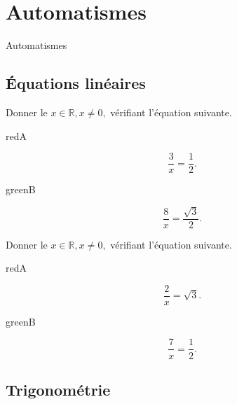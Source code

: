 \documentclass[14pt]{beamer}
\newcommand{\R}{\mathbb{R}}
\begin{document}
\section{Automatismes}

\begin{frame}

\centering \huge
Automatismes

\end{frame}

\subsection{Équations linéaires}

\begin{frame}{1}
	Donner le $x\in\R, x\neq0,$ vérifiant l'équation suivante.
	
		\begin{mybox}{red}{A}
		\begin{center}
			\[ \dfrac3x = \dfrac12. \]
		\end{center}
		\end{mybox}
		\begin{mybox}{green}{B}
		\begin{center}
			\[ \dfrac8x  =\dfrac{\sqrt{3}}2. \]
		\end{center}
		\end{mybox}

\end{frame}


\begin{frame}{2}
	Donner le $x\in\R, x\neq0,$ vérifiant l'équation suivante.
	
		\begin{mybox}{red}{A}
		\begin{center}
			\[ \dfrac2x =\sqrt{3}. \]
		\end{center}
		\end{mybox}
		\begin{mybox}{green}{B}
		\begin{center}
			\[ \dfrac7x  =\dfrac12. \]
		\end{center}
		\end{mybox}
\end{frame}

\subsection{Trigonométrie}
\end{document}

